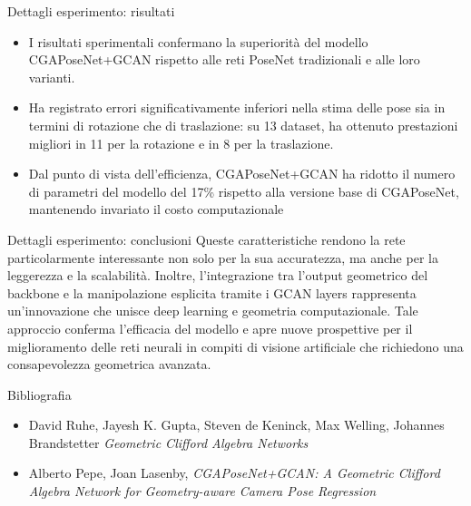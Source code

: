 \begin{frame}{Dettagli esperimento: risultati}
   \begin{itemize}
      \item I risultati sperimentali confermano la superiorità del modello CGAPoseNet+GCAN rispetto alle reti PoseNet tradizionali e alle loro varianti.
      \item Ha registrato errori significativamente inferiori nella stima delle pose sia in termini di rotazione che di traslazione: su 13 dataset, ha ottenuto prestazioni migliori in 11 per la rotazione e in 8 per la traslazione.
      \item Dal punto di vista dell’efficienza, CGAPoseNet+GCAN ha ridotto il numero di parametri del modello del 17\% rispetto alla versione base di CGAPoseNet, mantenendo invariato il costo computazionale
   \end{itemize}
\end{frame}
   
\begin{frame}{Dettagli esperimento: conclusioni}
   Queste caratteristiche rendono la rete particolarmente interessante non solo per la sua accuratezza, ma anche per la leggerezza e la scalabilità.
    Inoltre, l’integrazione tra l’output geometrico del backbone e la manipolazione esplicita tramite i GCAN layers rappresenta un’innovazione che unisce deep learning e geometria computazionale. 
    Tale approccio conferma l’efficacia del modello e apre nuove prospettive per il miglioramento delle reti neurali in compiti di visione artificiale che richiedono una consapevolezza geometrica avanzata.
\end{frame}
\begin{frame}{Bibliografia}
    \begin{itemize}
        \item David Ruhe, Jayesh K. Gupta, Steven de Keninck, Max Welling, Johannes Brandstetter
            \emph{Geometric Clifford Algebra Networks}
            
        \item Alberto Pepe, Joan Lasenby, \emph{CGAPoseNet+GCAN: A Geometric Clifford Algebra Network for
        Geometry-aware Camera Pose Regression}
    \end{itemize}
\end{frame}
